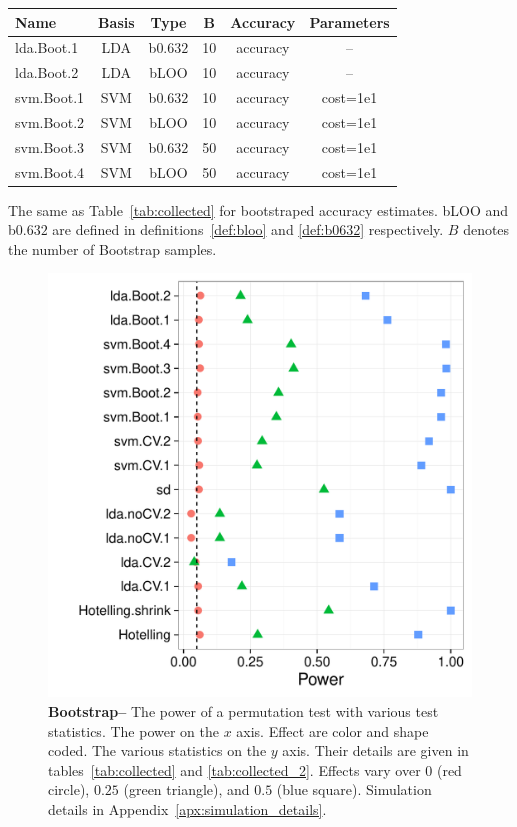 \documentclass[12pt,a4paper]{article}
\theoremstyle{definition}
\begin{document}
\bigskip

\begin{tcolorbox}
\centering
\begin{tabular}{l|c|c|c|c|c}
Name & Basis & Type & B & Accuracy & Parameters\\ 
\hline
\hline
lda.Boot.1 & LDA & b$0.632$ 	& 10 & accuracy &  -- \\ 
lda.Boot.2 & LDA & bLOO 	& 10 & accuracy &  -- \\ 
svm.Boot.1 & SVM & b$0.632$ 	& 10 & accuracy & cost=1e1 \\ 
svm.Boot.2 & SVM & bLOO 	& 10 & accuracy & cost=1e1 \\ 
svm.Boot.3 & SVM & b$0.632$ 	& 50 & accuracy & cost=1e1 \\ 
svm.Boot.4 & SVM & bLOO 	& 50 & accuracy & cost=1e1 \\ 
\end{tabular} 
\captionsetup{type=table}
\caption{
The same as Table~\ref{tab:collected} for bootstraped accuracy estimates. 
bLOO and b$0.632$ are defined in definitions~\ref{def:bloo} and \ref{def:b0632} respectively.
$B$ denotes the number of Bootstrap samples. } 
\label{tab:collected_2}
\end{tcolorbox}


\begin{figure}[ht]
\centering
	  \includegraphics[width=0.7\linewidth]{"art/2016-08-09 20:09:20"}
	  \caption{
		  \textbf{Bootstrap--}
		  The power of a permutation test with various test statistics. 
		  The power on the $x$ axis. 
		  Effect are color and shape coded. 
		  The various statistics on the $y$ axis. 
		  Their details are given in tables~\ref{tab:collected} and \ref{tab:collected_2}. 
		  Effects vary over $0$ (red circle), $0.25$ (green triangle), and $0.5$ (blue square). 
		  Simulation details in Appendix~\ref{apx:simulation_details}.
		  } 
	\label{fig:bootstrap}
\end{figure}
\end{document}
